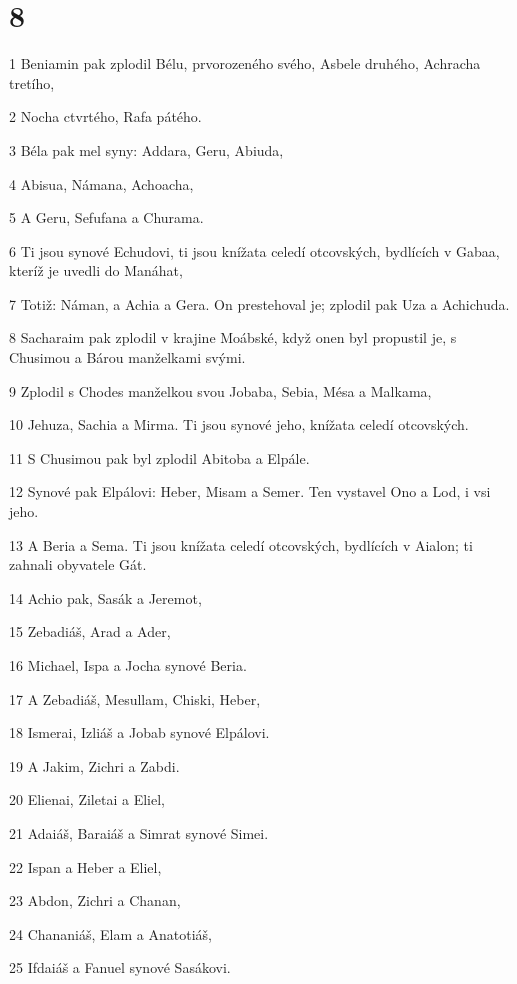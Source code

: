 \chapter{8}

\par 1 Beniamin pak zplodil Bélu, prvorozeného svého, Asbele druhého, Achracha tretího,
\par 2 Nocha ctvrtého, Rafa pátého.
\par 3 Béla pak mel syny: Addara, Geru, Abiuda,
\par 4 Abisua, Námana, Achoacha,
\par 5 A Geru, Sefufana a Churama.
\par 6 Ti jsou synové Echudovi, ti jsou knížata celedí otcovských, bydlících v Gabaa, kteríž je uvedli do Manáhat,
\par 7 Totiž: Náman, a Achia a Gera. On prestehoval je; zplodil pak Uza a Achichuda.
\par 8 Sacharaim pak zplodil v krajine Moábské, když onen byl propustil je, s Chusimou a Bárou manželkami svými.
\par 9 Zplodil s Chodes manželkou svou Jobaba, Sebia, Mésa a Malkama,
\par 10 Jehuza, Sachia a Mirma. Ti jsou synové jeho, knížata celedí otcovských.
\par 11 S Chusimou pak byl zplodil Abitoba a Elpále.
\par 12 Synové pak Elpálovi: Heber, Misam a Semer. Ten vystavel Ono a Lod, i vsi jeho.
\par 13 A Beria a Sema. Ti jsou knížata celedí otcovských, bydlících v Aialon; ti zahnali obyvatele Gát.
\par 14 Achio pak, Sasák a Jeremot,
\par 15 Zebadiáš, Arad a Ader,
\par 16 Michael, Ispa a Jocha synové Beria.
\par 17 A Zebadiáš, Mesullam, Chiski, Heber,
\par 18 Ismerai, Izliáš a Jobab synové Elpálovi.
\par 19 A Jakim, Zichri a Zabdi.
\par 20 Elienai, Ziletai a Eliel,
\par 21 Adaiáš, Baraiáš a Simrat synové Simei.
\par 22 Ispan a Heber a Eliel,
\par 23 Abdon, Zichri a Chanan,
\par 24 Chananiáš, Elam a Anatotiáš,
\par 25 Ifdaiáš a Fanuel synové Sasákovi.
